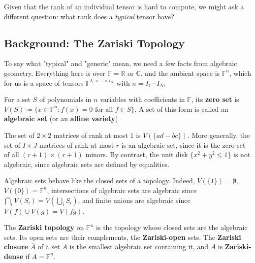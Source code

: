   Given that the rank of an individual tensor is hard to compute, we might ask a different question: what rank does a \textit{typical} tensor have? 

\subsection{Background: The Zariski Topology}

  To say what "typical" and "generic" mean, we need a few facts from algebraic geometry. Everything here is over $\mathbb{F} = \mathbb{R}$ or $\mathbb{C}$, and the ambient space is $\mathbb{F}^n$, which for us is a space of tensors $\mathbb{F}^{I_1 \times \cdots \times I_N}$ with $n = I_1 \cdots I_N$. 

  \begin{definition}
    \label{def:algebraic-set}
    For a set $S$ of polynomials in $n$ variables with coefficients in $\mathbb{F}$, its \textbf{zero set} is $V(S) \coloneqq \{x \in \mathbb{F}^n : f(x) = 0 \text{ for all } f \in S\}$. A set of this form is called an \textbf{algebraic set} (or an \textbf{affine variety}). 
  \end{definition}

  \begin{example}
    The set of $2 \times 2$ matrices of rank at most $1$ is $V(\{ad - bc\})$. More generally, the set of $I \times J$ matrices of rank at most $r$ is an algebraic set, since it is the zero set of all $(r+1) \times (r+1)$ minors. By contrast, the unit disk $\{x^2 + y^2 \leq 1\}$ is not algebraic, since algebraic sets are defined by equalities. 
  \end{example}

  Algebraic sets behave like the closed sets of a topology. Indeed, $V(\{1\}) = \emptyset$, $V(\{0\}) = \mathbb{F}^n$, intersections of algebraic sets are algebraic since $\bigcap_i V(S_i) = V(\bigcup_i S_i)$, and finite unions are algebraic since $V(f) \cup V(g) = V(fg)$. 

  \begin{definition}
    The \textbf{Zariski topology} on $\mathbb{F}^n$ is the topology whose closed sets are the algebraic sets. Its open sets are their complements, the \textbf{Zariski-open} sets. The \textbf{Zariski closure} $\overline{A}$ of a set $A$ is the smallest algebraic set containing it, and $A$ is \textbf{Zariski-dense} if $\overline{A} = \mathbb{F}^n$. 
  \end{definition}

